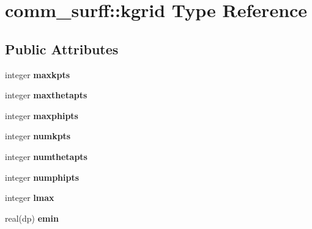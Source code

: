 \hypertarget{structcomm__surff_1_1kgrid}{}\section{comm\+\_\+surff\+:\+:kgrid Type Reference}
\label{structcomm__surff_1_1kgrid}
\subsection*{Public Attributes}
\begin{DoxyCompactItemize}
\item 
\mbox{\label{structcomm__surff_1_1kgrid_a8482578d3ff790a2439c8663558fe4e1}} 
integer {\bfseries maxkpts}
\item 
\mbox{\label{structcomm__surff_1_1kgrid_ac64c1ba59d5ad4e3d28e2cb0414f8991}} 
integer {\bfseries maxthetapts}
\item 
\mbox{\label{structcomm__surff_1_1kgrid_a1561c5a9d573a6cbb43cb3786bf5077a}} 
integer {\bfseries maxphipts}
\item 
\mbox{\label{structcomm__surff_1_1kgrid_a5059aeb238cd68d30c8a5fe866abbdfa}} 
integer {\bfseries numkpts}
\item 
\mbox{\label{structcomm__surff_1_1kgrid_aeae92795de123c398ce1f265c0473fdc}} 
integer {\bfseries numthetapts}
\item 
\mbox{\label{structcomm__surff_1_1kgrid_a6c8c16e42074049087717738988f79eb}} 
integer {\bfseries numphipts}
\item 
\mbox{\label{structcomm__surff_1_1kgrid_ac85234accff9200bc0e1ca810de1ec5e}} 
integer {\bfseries lmax}
\item 
\mbox{\label{structcomm__surff_1_1kgrid_a615458d2a8eaeb4f3ca1b90f7d29acef}} 
real(dp) {\bfseries emin}
\item 
\mbox{\label{structcomm__surff_1_1kgrid_ac943b2f8cde73f158314c6fb508285a3}} 

\end{DoxyCompactItemize}
